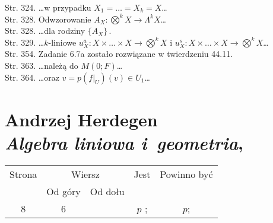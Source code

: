 \documentclass[a4paper,11pt]{article}
\numberwithin{equation}{section}
\begin{document}
Str. 324. \ldots w przypadku $X_{ 1 } = \ldots = X_{ k } = X$\ldots \\
Str. 328. Odwzorowanie $A_{ X } : \bigotimes^{ k } X \rightarrow \Lambda^{ k } X$\ldots \\
Str. 328. \ldots dla rodziny $\{ A_{ X } \} \, .$ \\
Str. 329. \ldots $k$-liniowe
$u^{ a }_{ X } : X \times \ldots \times X \rightarrow \bigotimes^{ k } X$ i
$u^{ s }_{ X } : X \times \ldots \times X \rightarrow \bigotimes^{ k } X$\ldots \\
Str. 354. Zadanie \romannumeral6.7a zostało rozwiązane w
twierdzeniu 44.11. \\
Str. 363. \ldots należą do $M( 0; F )$\ldots \\
Str. 364. \ldots oraz $v = p( f |_{ U } ) ( v ) \in U_{ 1 }$\ldots \\


















\newpage

\section{ %
  Andrzej Herdegen \\
  \textit{Algebra liniowa i~geometria},
  \cite{HerdegenAlgebraLiniowaIGeometria2010}}

\vspace{0em}



\vspace{0em}






\begin{center}

  \begin{tabular}{|c|c|c|c|c|}
    \hline
    Strona & \multicolumn{2}{c|}{Wiersz} & Jest
                              & Powinno być \\ \cline{2-3}
    & Od góry & Od dołu & & \\
    \hline
    8   & 6 & & $p$ ; & $p$; \\
    \hline
  \end{tabular}

\end{center}
\end{document}
